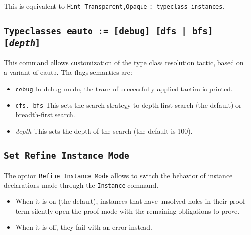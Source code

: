 This is equivalent to {\tt Hint Transparent,Opaque} {\ident} {\tt: typeclass\_instances}.

\subsection{\tt Typeclasses eauto := [debug] [dfs | bfs] [\emph{depth}]}
\label{TypeclassesEauto}

This command allows customization of the type class resolution tactic,
based on a variant of eauto. The flags semantics are:
\begin{itemize}
\item {\tt debug} In debug mode, the trace of successfully applied
  tactics is printed.
\item {\tt dfs, bfs} This sets the search strategy to depth-first search
  (the default) or breadth-first search.
\item {\emph{depth}} This sets the depth of the search (the default is 100).
\end{itemize}

\subsection{\tt Set Refine Instance Mode}

The option {\tt Refine Instance Mode} allows to switch the behavior of instance
declarations made through the {\tt Instance} command.
\begin{itemize}
\item When it is on (the default), instances that have unsolved holes in their
proof-term silently open the proof mode with the remaining obligations to prove.
\item When it is off, they fail with an error instead.
\end{itemize}

